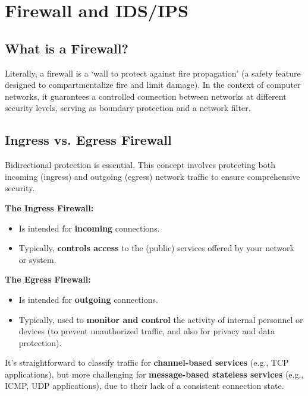 \chapter{Firewall and IDS/IPS}
\cite{05_Firewalling}

\section*{What is a Firewall?}
Literally, a firewall is a ‘wall to protect against fire propagation' (a safety feature designed to compartmentalize fire and limit damage). In the context of computer networks, it guarantees a controlled connection between networks at different security levels, serving as boundary protection and a network filter.

\section{Ingress vs. Egress Firewall}
\begin{tcolorbox}[colback=red!10!white, colframe=red!70!black, coltitle=white, title=Beware]
    Bidirectional protection is essential. This concept involves protecting both incoming (ingress) and outgoing (egress) network traffic to ensure comprehensive security.
\end{tcolorbox}

\textbf{The Ingress Firewall:}
\begin{itemize}
    \item Is intended for \textbf{incoming} connections.
    \item Typically, \textbf{controls access} to the (public) services offered by your network or system.
\end{itemize}

\textbf{The Egress Firewall:}
\begin{itemize}
    \item Is intended for \textbf{outgoing} connections.
    \item Typically, used to \textbf{monitor and control} the activity of internal personnel or devices (to prevent unauthorized traffic, and also for privacy and data protection).
\end{itemize}

\begin{tcolorbox}[colback=blue!10!white, colframe=blue!50!white, title=Classification of Traffic]
    It's straightforward to classify traffic for \textbf{channel-based services} (e.g., TCP applications), but more challenging for \textbf{message-based stateless services} (e.g., ICMP, UDP applications), due to their lack of a consistent connection state.
\end{tcolorbox}

